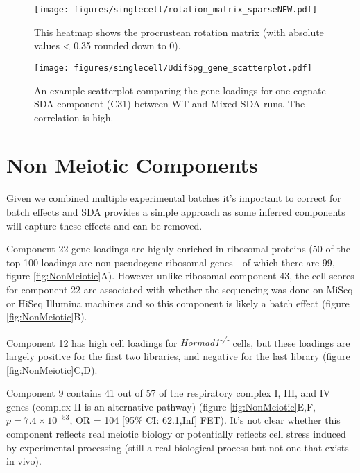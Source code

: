 \begin{figure}[H]
	\centering
	\texttt{[image: figures/singlecell/rotation\_matrix\_sparseNEW.pdf]}
	\caption[Procrustean Rotation Matrix]{This heatmap shows the procrustean rotation matrix (with absolute values < 0.35 rounded down to 0).}
	\label{fig:WT_Mix_Rotation}
\end{figure}

\begin{figure}[H]
	\centering
	\texttt{[image: figures/singlecell/UdifSpg\_gene\_scatterplot.pdf]}
	\caption[Component 31 WT vs Mixed]{An example scatterplot comparing the gene loadings for one cognate SDA component (C31) between WT and Mixed SDA runs. The correlation is high.}
	\label{fig:WT_Mix_Correlation}
\end{figure}


\section{Non Meiotic Components}

Given we combined multiple experimental batches it's important to correct for batch effects and SDA provides a simple approach as some inferred components will capture these effects and can be removed.

Component 22 gene loadings are highly enriched in ribosomal proteins (50 of the top 100 loadings are non pseudogene ribosomal genes - of which there are 99, figure \ref{fig:NonMeiotic}A). However unlike ribosomal component 43, the cell scores for component 22 are associated with whether the sequencing was done on MiSeq or HiSeq Illumina machines and so this component is likely a batch effect (figure \ref{fig:NonMeiotic}B).

Component 12 has high cell loadings for \textit{Hormad1\textsuperscript{-/-}} cells, but these loadings are largely positive for the first two libraries, and negative for the last library (figure \ref{fig:NonMeiotic}C,D).

Component 9 contains 41 out of 57 of the respiratory complex I, III, and IV genes (complex II is an alternative pathway) (figure \ref{fig:NonMeiotic}E,F, $p = 7.4\times10^{-53}$, OR = 104 [95\% CI: 62.1,Inf] FET). It's not clear whether this component reflects real meiotic biology or potentially reflects cell stress induced by experimental processing (still a real biological process but not one that exists in vivo).

